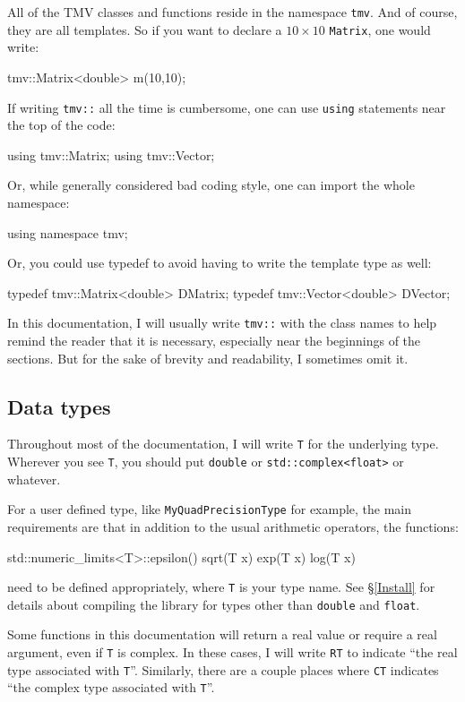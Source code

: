 \documentclass[twoside,letterpaper,11pt]{article}
\renewcommand{\tt}[1]{{\lstinline {#1}}}
\begin{document}
All of the TMV classes and functions reside in the namespace \tt{tmv}. 
And of course, they are all templates.
So if you want to declare a $10 \times 10$ \tt{Matrix}, one would write:
\begin{tmvcode}
tmv::Matrix<double> m(10,10);
\end{tmvcode}

If writing \tt{tmv::} all the time is cumbersome, one can use \tt{using}
statements near the top of the code:
\begin{tmvcode}
using tmv::Matrix;
using tmv::Vector;
\end{tmvcode}
Or, while generally considered bad coding style, one can import the whole namespace:
\begin{tmvcode}
using namespace tmv;
\end{tmvcode}
Or, you could use typedef to avoid having to write the template type as well:
\begin{tmvcode}
typedef tmv::Matrix<double> DMatrix;
typedef tmv::Vector<double> DVector;
\end{tmvcode}
In this documentation, I will usually write \tt{tmv::} with the class names to help remind the reader
that it is necessary, especially near the 
beginnings of the sections.  
But for the sake of brevity and readability, I sometimes omit it.

\subsection {Data types}

Throughout most of the documentation, I will write \tt{T} for the underlying type.
Wherever you see \tt{T}, you should put \tt{double} or \tt{std::complex<float>} or whatever.

For a user defined type, like \tt{MyQuadPrecisionType} for example, the main requirements are that 
in addition to the usual arithmetic operators, the functions:
\begin{tmvcode}
std::numeric_limits<T>::epsilon()
sqrt(T x) 
exp(T x) 
log(T x)
\end{tmvcode}
need to be defined appropriately, where \tt{T} is your type name.  See \S\ref{Install} for details about
compiling the library for types other than \tt{double} and \tt{float}.

Some functions in this documentation will return a real value or require a real argument, 
even if \tt{T} is complex.  In these cases, I will write \tt{RT} to indicate 
``the real type associated with \tt{T}''.  Similarly, there are a couple places where \tt{CT}
indicates ``the complex type associated with \tt{T}''.
\end{document}
